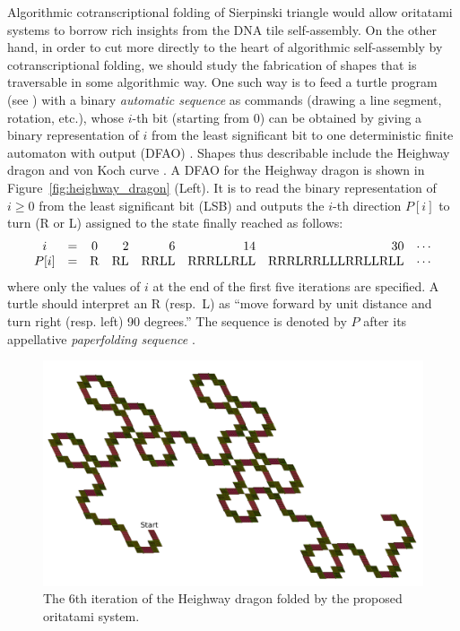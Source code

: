 \documentclass{article}
\theoremstyle{remark}
\begin{document}
Algorithmic cotranscriptional folding of Sierpinski triangle would allow oritatami systems to borrow rich insights from the DNA tile self-assembly. 
On the other hand, in order to cut more directly to the heart of algorithmic self-assembly by cotranscriptional folding, we should study the fabrication of shapes that is traversable in some algorithmic way. 
One such way is to feed a turtle program (see \cite{AbelsondiSessa1981}) with a binary \textit{automatic sequence} as commands (drawing a line segment, rotation, etc.), whose $i$-th bit (starting from 0) can be obtained by giving a binary representation of $i$ from the least significant bit to one deterministic finite automaton with output (DFAO) \cite{AlloucheShallit2003}.
Shapes thus describable include the Heighway dragon \cite{AlloucheShallit2003} and von Koch curve \cite{MaHoldener2005}. 
A DFAO for the Heighway dragon is shown in Figure~\ref{fig:heighway_dragon} (Left). 
It is to read the binary representation of $i \ge 0$ from the least significant bit (LSB) and outputs the $i$-th direction $P[i]$ to turn (R or L) assigned to the state finally reached as follows: 
\[
\begin{array}{cccrrrrc}
i 	&=& 0 &  2 & 6 & 14 & 30 & \cdots \\
P[i] 	&=& {\rm R} & {\rm RL} & {\rm RRLL} & {\rm RRRLLRLL} & {\rm RRRLRRLLLRRLLRLL} & \cdots
\end{array}
\]
where only the values of $i$ at the end of the first five iterations are specified. 
A turtle should interpret an R (resp.~L) as ``move forward by unit distance and turn right (resp. left) 90 degrees.''
The sequence is denoted by $P$ after its appellative \textit{paperfolding sequence} \cite{AlloucheShallit2003}. 

\begin{figure}[htb]
\centering
\includegraphics[width=\linewidth]{6bit_heighway.pdf}
\caption{The 6th iteration of the Heighway dragon folded by the proposed oritatami system.}
\label{fig:heighway6_oritatami}
\end{figure}
\end{document}

